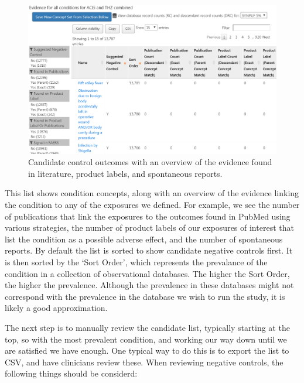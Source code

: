 \documentclass[11pt]{book}
\begin{document}
\begin{figure}

{\centering \includegraphics[width=1\linewidth]{images/MethodValidity/candidateNcs} 

}

\caption{Candidate control outcomes with an overview of the evidence found in literature, product labels, and spontaneous reports.}\label{fig:candidateNcs}
\end{figure}

This list shows condition concepts, along with an overview of the
evidence linking the condition to any of the exposures we defined. For
example, we see the number of publications that link the exposures to
the outcomes found in PubMed using various strategies, the number of
product labels of our exposures of interest that list the condition as a
possible adverse effect, and the number of spontaneous reports. By
default the list is sorted to show candidate negative controls first. It
is then sorted by the `Sort Order', which represents the prevalance of
the condition in a collection of observational databases. The higher the
Sort Order, the higher the prevalence. Although the prevalence in these
databases might not correspond with the prevalence in the database we
wish to run the study, it is likely a good approximation.

The next step is to manually review the candidate list, typically
starting at the top, so with the most prevalent condition, and working
our way down until we are satisfied we have enough. One typical way to
do this is to export the list to CSV, and have clinicians review these.
When reviewing negative controls, the following things should be
considerd:
\end{document}
